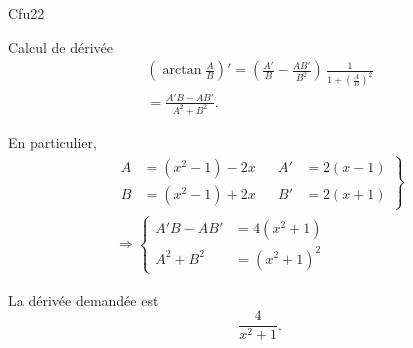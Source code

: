 \begin{tiny}Cfu22\end{tiny}  Calcul de dérivée
\begin{multline*}
  \left( \arctan \frac{A}{B} \right)'
  = \left(\frac{A'}{B} - \frac{AB'}{B^2}\right)\, \frac{1}{1 + \left(\frac{A}{B}\right)^2}\\
  = \frac{A'B - A B'}{A^2 + B^2}.
\end{multline*}

En particulier,
\begin{multline*}
\left.
\begin{aligned}
  A &= (x^2-1) - 2x & & A' &= 2(x-1)\\
  B &= (x^2-1) + 2x & & B' &= 2(x+1)
\end{aligned} 
\right\rbrace
\\ \Rightarrow
\left\lbrace
\begin{aligned}
  A'B - AB' &= 4(x^2+1)\\
  A^2 + B^2 &= (x^2+1)^2
\end{aligned}
\right.
\end{multline*}

La dérivée demandée est
\[
  \frac{4}{x^2 + 1}.
\]

